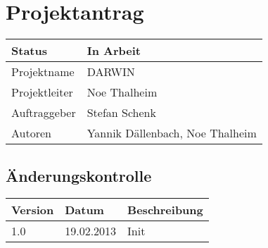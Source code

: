 \documentclass{scrartcl}
\begin{document}
	\section*{Projektantrag}
	
	\begin{tabularx}{\textwidth}{| X | X |}
	\hline
	Status & In Arbeit\\
	\hline
	Projektname & DARWIN\\
	\hline
	Projektleiter & Noe Thalheim\\
	\hline
	Auftraggeber & Stefan Schenk\\
	\hline
	Autoren & Yannik Dällenbach, Noe Thalheim\\
	\hline
	\end{tabularx}
	
	\subsection*{Änderungskontrolle}
	\begin{tabularx}{\textwidth}{| X | X | X |}
	\hline
	\rowcolor[gray]{0.9} Version & Datum & Beschreibung\\
	\hline
	1.0 & 19.02.2013 & Init\\
	\hline
	\end{tabularx}

	\pagebreak
	\tableofcontents
	\pagebreak
	
	
	
	
	
	
	
	
	
\end{document}
